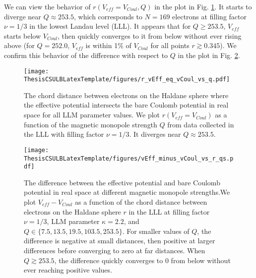 We can view the behavior of $r(V_{eff}=V_{Coul},Q)$ in the plot in Fig. \ref{fig:r_vEff_eq_vCoul_vs_q}. It starts to diverge near $Q\approx253.5$, which corresponds to $N=169$ electrons at filling factor $\nu=1/3$ in the lowest Landau level (LLL). It appears that for $Q\geq253.5$, $V_{eff}$ starts below $V_{Coul}$, then quickly converges to it from below without ever rising above (for $Q=252.0$, $V_{eff}$ is within 1\% of $V_{Coul}$ for all points $r\gtrsim0.345$). We confirm this behavior of the difference with respect to $Q$ in the plot in Fig. \ref{fig:vEff_minus_vCoul_vs_r_qs}.

\begin{figure}[H]
\begin{center}
\texttt{[image: ThesisCSULBLatexTemplate/figures/r\_vEff\_eq\_vCoul\_vs\_q.pdf]}
\caption[The chord distance between electrons on the Haldane sphere where the effective potential intersects the bare Coulomb potential in real space for all LLM parameter values.]{The chord distance between electrons on the Haldane sphere where the effective potential intersects the bare Coulomb potential in real space for all LLM parameter values. We plot $r(V_{eff}=V_{Coul})$ as a function of the magnetic monopole strength $Q$ from data collected in the LLL with filling factor $\nu=1/3$. It diverges near $Q\approx253.5$.}
\label{fig:r_vEff_eq_vCoul_vs_q} 
\end{center}
\end{figure}

\begin{figure}[p]
\begin{center}
\texttt{[image: ThesisCSULBLatexTemplate/figures/vEff\_minus\_vCoul\_vs\_r\_qs.pdf]}
\caption[The difference between the effective potential and bare Coulomb potential in real space at different magnetic monopole strengths.]{The difference between the effective potential and bare Coulomb potential in real space at different magnetic monopole strengths.We plot $V_{eff}-V_{Coul}$ as a function of the chord distance between electrons on the Haldane sphere $r$ in the LLL at filling factor $\nu=1/3$, LLM parameter $\kappa=2.2$, and $Q\in\{7.5,13.5,19.5,103.5,253.5\}$. For smaller values of $Q$, the difference is negative at small distances, then positive at larger differences before converging to zero at far distances. When $Q\gtrsim253.5$, the difference quickly converges to 0 from below without ever reaching positive values.}
\label{fig:vEff_minus_vCoul_vs_r_qs} 
\end{center}
\end{figure}

\singlespacing